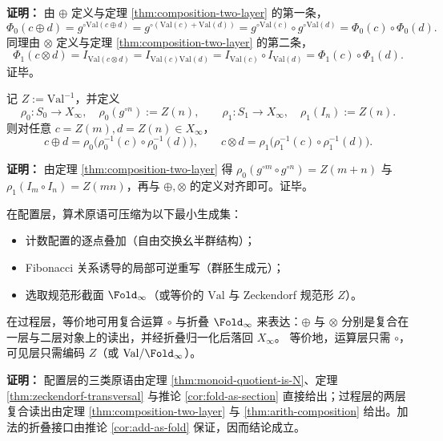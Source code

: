 \textbf{证明：}
由 $\oplus$ 定义与定理 \ref{thm:composition-two-layer} 的第一条，
\[
\Phi_0(c\oplus d)=g^{\circ\mathrm{Val}(c\oplus d)}
=g^{\circ(\mathrm{Val}(c)+\mathrm{Val}(d))}
 =g^{\circ\mathrm{Val}(c)}\circ g^{\circ\mathrm{Val}(d)}
=\Phi_0(c)\circ\Phi_0(d).
\]
同理由 $\otimes$ 定义与定理 \ref{thm:composition-two-layer} 的第二条，
\[
\Phi_1(c\otimes d)=I_{\mathrm{Val}(c\otimes d)}
=I_{\mathrm{Val}(c)\mathrm{Val}(d)}
=I_{\mathrm{Val}(c)}\circ I_{\mathrm{Val}(d)}
=\Phi_1(c)\circ\Phi_1(d).
\]
证毕。

\begin{corollary}[仅复合的读出落回稳定地址]\label{cor:composition-pullback}
记 $Z:=\mathrm{Val}^{-1}$，并定义
\[
\rho_0:S_0\to X_\infty,\quad \rho_0(g^{\circ n}):=Z(n),\qquad
\rho_1:S_1\to X_\infty,\quad \rho_1(I_n):=Z(n).
\]
则对任意 $c=Z(m),d=Z(n)\in X_\infty$，
\[
c\oplus d=\rho_0\bigl(\rho_0^{-1}(c)\circ \rho_0^{-1}(d)\bigr),
\qquad
c\otimes d=\rho_1\bigl(\rho_1^{-1}(c)\circ \rho_1^{-1}(d)\bigr).
\]
\end{corollary}

\textbf{证明：}
由定理 \ref{thm:composition-two-layer} 得 $\rho_0(g^{\circ m}\circ g^{\circ n})=Z(m+n)$ 与 $\rho_1(I_m\circ I_n)=Z(mn)$，再与 $\oplus,\otimes$ 的定义对齐即可。证毕。

\begin{corollary}\label{cor:primitive-free-arith}
在配置层，算术原语可压缩为以下最小生成集：
\begin{itemize}
  \item 计数配置的逐点叠加（自由交换幺半群结构）；
  \item Fibonacci 关系诱导的局部可逆重写（群胚生成元）；
  \item 选取规范形截面 $\Fold_\infty$（或等价的 $\mathrm{Val}$ 与 Zeckendorf 规范形 $Z$）。
\end{itemize}
在过程层，等价地可用复合运算 $\circ$ 与折叠 $\Fold_\infty$ 来表达：$\oplus$ 与 $\otimes$ 分别是复合在一层与二层对象上的读出，并经折叠归一化后落回 $X_\infty$。
等价地，运算层只需 $\circ$，可见层只需编码 $Z$（或 $\mathrm{Val}/\Fold_\infty$）。
\end{corollary}

\textbf{证明：}
配置层的三类原语由定理 \ref{thm:monoid-quotient-is-N}、定理 \ref{thm:zeckendorf-transversal} 与推论 \ref{cor:fold-as-section} 直接给出；过程层的两层复合读出由定理 \ref{thm:composition-two-layer} 与 \ref{thm:arith-composition} 给出。加法的折叠接口由推论 \ref{cor:add-as-fold} 保证，因而结论成立。

